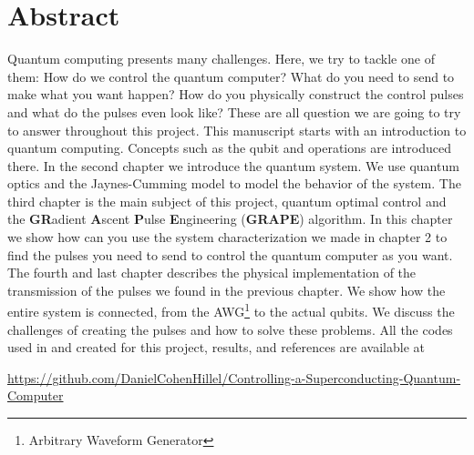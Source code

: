 


\begingroup
\let\clearpage\relax
\let\cleardoublepage\relax
\let\cleardoublepage\relax

\chapter*{Abstract}
  Quantum computing presents many challenges. Here, we try to tackle one of them: How do we control the quantum computer? What do you need to send to make what you want happen? How do you physically construct the control pulses and what do the pulses even look like? These are all question we are going to try to answer throughout this project.\newline\newline
   This manuscript starts with an introduction to quantum computing. Concepts such as the qubit and operations are introduced there.\newline\newline
   In the second chapter we introduce the quantum system. We use quantum optics and the Jaynes-Cumming model to model the behavior of the system.\newline\newline
   The third chapter is the main subject of this project, quantum optimal control and the \textbf{GR}adient \textbf{A}scent \textbf{P}ulse \textbf{E}ngineering (\textbf{GRAPE}) algorithm. In this chapter we show how can you use the system characterization we made in chapter 2 to find the pulses you need to send to control the quantum computer as you want.\newline\newline
   The fourth and last chapter describes the physical implementation of the transmission of the pulses we found in the previous chapter. We show how the entire system is connected, from the AWG\footnote{Arbitrary Waveform Generator} to the actual qubits. We discuss the challenges of creating the pulses and how to solve these problems.\newline\newline
   All the codes used in and created for this project, results, and references are available at\newline
\begin{center}
\url{https://github.com/DanielCohenHillel/Controlling-a-Superconducting-Quantum-Computer}
\end{center}

\endgroup			

\vfill
